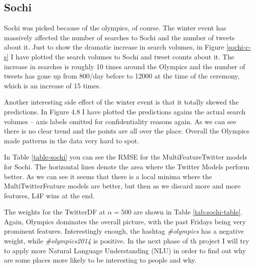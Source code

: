 \documentclass[minf,twoside,singlespacing,parskip,frontabs,notimes,11pt]{infthesis}
\begin{document}
\newpage
\subsection{Sochi}


Sochi was picked because of the olympics, of course. The winter event has massively affected the number of searches to Sochi and the number of tweets about it. Just to show the dramatic increase in search volumes, in Figure \ref{sochi-c-s} I have plotted the search volumes to Sochi and tweet counts about it. The increase in searches is roughly 10 times around the Olympics and the number of tweets has gone up from 800/day before to 12000 at the time of the ceremony, which is an increase of 15 times. 

Another interesting side effect of the winter event is that it totally skewed the predictions. In Figure 4.8 I have plotted the predictions agains the actual search volumes -- axis labels omitted for confidentiality reasons again. As we can see there is no clear trend and the points are all over the place. Overall the Olympics made patterns in the data very hard to spot. 


In Table \ref{table-sochi} you can see the RMSE for the MultiFeatureTwitter models for Sochi. The horizontal lines denote the area where the Twitter Models perform better. As we can see it seems that there is a local minima where the MultiTwitterFeature models are better, but then as we discard more and more features, L4F wins at the end. 


The weights for the TwitterDF at $\alpha=500$ are shown in Table \ref{tab:sochi-table}. Again, Olympics dominates the overall picture, with the past Fridays being very prominent features. Interestingly enough, the hashtag \textit{\#olympics} has a negative weight, while \textit{\#olympics2014} is positive. In the next phase of th project I will try to apply more Natural Language Understanding (NLU) in order to find out why are some places more likely to be interesting to people and why. 
\end{document}
